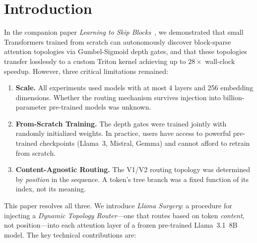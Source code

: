 \documentclass[11pt,a4paper]{article}
\begin{document}
\begin{abstract}
phase at $O(N)$ theoretical complexity. To our knowledge, this is the first demonstration of differentiable ultrametric topology injection into a production-scale pre-trained LLM.
\end{abstract}

\section{Introduction}

In the companion paper \emph{Learning to Skip Blocks}~\citep{learningtoskip2026}, we demonstrated that small Transformers trained from scratch can autonomously discover block-sparse attention topologies via Gumbel-Sigmoid depth gates, and that these topologies transfer losslessly to a custom Triton kernel achieving up to $28\times$ wall-clock speedup. However, three critical limitations remained:

\begin{enumerate}
    \item \textbf{Scale.} All experiments used models with at most 4 layers and 256 embedding dimensions. Whether the routing mechanism survives injection into billion-parameter pre-trained models was unknown.
    \item \textbf{From-Scratch Training.} The depth gates were trained jointly with randomly initialized weights. In practice, users have access to powerful pre-trained checkpoints (Llama~3, Mistral, Gemma) and cannot afford to retrain from scratch.
    \item \textbf{Content-Agnostic Routing.} The V1/V2 routing topology was determined by \emph{position} in the sequence. A token's tree branch was a fixed function of its index, not its meaning.
\end{enumerate}

This paper resolves all three. We introduce \emph{Llama Surgery}: a procedure for injecting a \emph{Dynamic Topology Router}---one that routes based on token \emph{content}, not position---into each attention layer of a frozen pre-trained Llama~3.1~8B model. The key technical contributions are:
\end{document}
